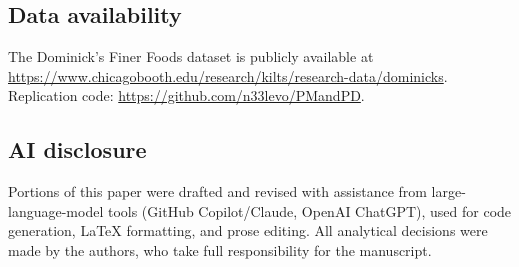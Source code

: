 \documentclass[11pt,a4paper]{article}
\theoremstyle{plain}
\theoremstyle{definition}
\theoremstyle{remark}
\begin{document}
\subsection*{Data availability}
The Dominick's Finer Foods dataset is publicly available at \url{https://www.chicagobooth.edu/research/kilts/research-data/dominicks}.
Replication code: \url{https://github.com/n33levo/PMandPD}.

\subsection*{AI disclosure}
Portions of this paper were drafted and revised with assistance from large-language-model tools (GitHub Copilot/Claude, OpenAI ChatGPT), used for code generation, \LaTeX{} formatting, and prose editing.
All analytical decisions were made by the authors, who take full responsibility for the manuscript.
\end{document}
